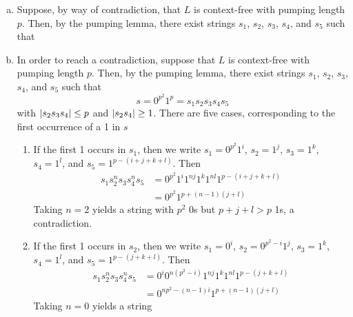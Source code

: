 \begin{solution}\mbox{\\}
    \begin{enumerate}[(a)]
        \item Suppose, by way of contradiction, that \(L\) is context-free with pumping length \(p\). Then, by the pumping lemma, there exist strings \(s_1\), \(s_2\), \(s_3\), \(s_4\), and \(s_5\) such that 
        \item In order to reach a contradiction, suppose that \(L\) is context-free with pumping length \(p\). Then, by the pumping lemma, there exist strings \(s_1\), \(s_2\), \(s_3\), \(s_4\), and \(s_5\) such that \[s=0^{p^2}1^p=s_1 s_2 s_3 s_4 s_5\] with \(\abs{s_2 s_3 s_4}\leq p\) and \(\abs{s_2 s_4}\geq 1\). There are five cases, corresponding to the first occurrence of a 1 in \(s\)
        \begin{enumerate}[{Case} 1:]
            \item If the first 1 occurs in \(s_1\), then we write \(s_1=0^{p^2}1^i\), \(s_2=1^j\), \(s_3=1^k\), \(s_4=1^l\), and \(s_5=1^{p-(i+j+k+l)}\). Then 
            \begin{align*}
                s_1 s_2^n s_3 s_4^n s_5 &= 0^{p^2}1^i1^{nj}1^k1^{nl}1^{p-(i+j+k+l)}\\
                                        &= 0^{p^2}1^{p+(n-1)(j+l)}
            \end{align*}
            Taking \(n=2\) yields a string with \(p^2\) 0s but \(p+j+l>p\) 1s, a contradiction.
            \item If the first 1 occurs in \(s_2\), then we write \(s_1=0^i\), \(s_2=0^{p^2-i}1^j\), \(s_3=1^k\), \(s_4=1^l\), and \(s_5=1^{p-(j+k+l)}\). Then
            \begin{align*}
                s_1 s_2^n s_3 s_4^n s_5 &= 0^i 0^{n(p^2-i)}1^{nj}1^k1^{nl}1^{p-(j+k+l)}\\
                                        &= 0^{np^2-(n-1)i}1^{p+(n-1)(j+l)}
            \end{align*}
            Taking \(n=0\) yields a string 
        \end{enumerate}
        

\end{enumerate}
\end{solution}
